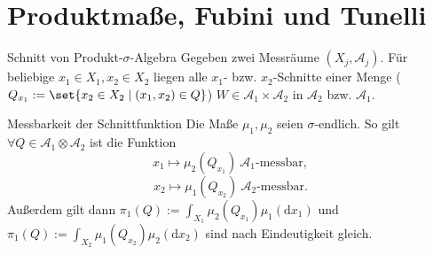 \section*{Produktmaße, Fubini und Tunelli}

\begin{karte}{Schnitt von Produkt-\(\sigma\)-Algebra}
    Gegeben zwei Messräume \( (X_j,\mathcal{A}_j) \).
    Für beliebige \( x_1 \in X_1, x_2 \in X_2 \) 
    liegen alle \(x_1\)- bzw. \(x_2\)-Schnitte einer Menge 
    (\( Q_{x_1} := \set{x_2 \in X_2 \;|\; (x_1,x_2)\in Q} \))
    \( W \in \mathcal{A}_1 \times \mathcal{A}_2 \) 
    in \(\mathcal{A}_2\) bzw. \( \mathcal{A}_1 \).
\end{karte}

\begin{karte}{Messbarkeit der Schnittfunktion}
    Die Maße \( \mu_1, \mu_2 \) seien \( \sigma \)-endlich. 
    So gilt \( \forall Q \in \mathcal{A}_1 \otimes \mathcal{A}_2 \) 
    ist die Funktion 
    \[ x_1 \mapsto \mu_2(Q_{x_1}) \ \mathcal{A}_1\text{-messbar}, \]
    \[ x_2 \mapsto \mu_1(Q_{x_2}) \ \mathcal{A}_2\text{-messbar}. \]
    Außerdem gilt dann 
    \( \pi_1(Q) := \int_{X_1} \mu_2(Q_{x_1}) \mu_1(\mathrm{d}x_1) \)
    und \\
    \( \pi_1(Q) := \int_{X_2} \mu_1(Q_{x_2}) \mu_2(\mathrm{d}x_2) \)
    sind nach Eindeutigkeit gleich.
\end{karte}